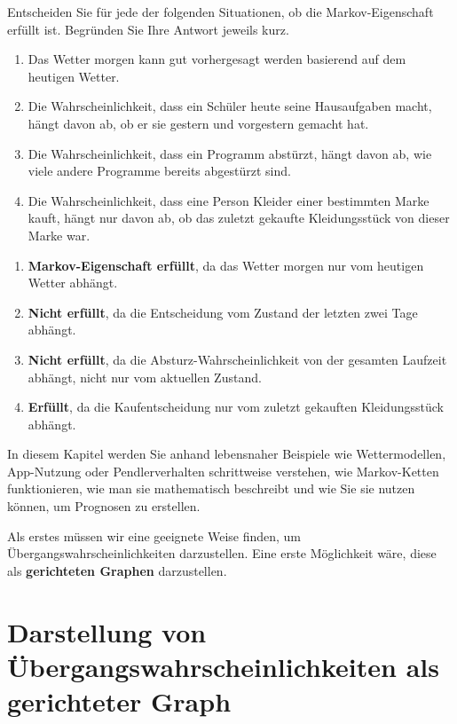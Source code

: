 \begin{myexercise}
    Entscheiden Sie für jede der folgenden Situationen, ob die Markov-Eigenschaft erfüllt ist. Begründen Sie Ihre Antwort jeweils kurz.
    \begin{enumerate}
        \item Das Wetter morgen kann gut vorhergesagt werden basierend auf dem heutigen Wetter.
        \item Die Wahrscheinlichkeit, dass ein Schüler heute seine Hausaufgaben macht, hängt davon ab, ob er sie gestern und vorgestern gemacht hat.
        \item Die Wahrscheinlichkeit, dass ein Programm abstürzt, hängt davon ab, wie viele andere Programme bereits abgestürzt sind.
        \item Die Wahrscheinlichkeit, dass eine Person Kleider einer bestimmten Marke kauft, hängt nur davon ab, ob das zuletzt gekaufte Kleidungsstück von dieser Marke war.
    \end{enumerate}
    \begin{myanswer}
        \begin{enumerate}
            \item \textbf{Markov-Eigenschaft erfüllt}, da das Wetter morgen nur vom heutigen Wetter abhängt.
            \item \textbf{Nicht erfüllt}, da die Entscheidung vom Zustand der letzten zwei Tage abhängt.
            \item \textbf{Nicht erfüllt}, da die Absturz-Wahrscheinlichkeit von der gesamten Laufzeit abhängt, nicht nur vom aktuellen Zustand.
            \item \textbf{Erfüllt}, da die Kaufentscheidung nur vom zuletzt gekauften Kleidungsstück abhängt.
        \end{enumerate}
    \end{myanswer}
\end{myexercise}

In diesem Kapitel werden Sie anhand lebensnaher Beispiele wie Wettermodellen, App-Nutzung oder Pendlerverhalten schrittweise verstehen, wie Markov-Ketten funktionieren, wie man sie mathematisch beschreibt und wie Sie sie nutzen können, um Prognosen zu erstellen.

Als erstes müssen wir eine geeignete Weise finden, um Übergangswahrscheinlichkeiten darzustellen. Eine erste Möglichkeit wäre, diese als \textbf{gerichteten Graphen} darzustellen.

\section{Darstellung von Übergangswahrscheinlichkeiten als gerichteter Graph}


